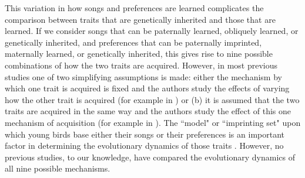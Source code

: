 \documentclass[12pt]{article}
\begin{document}
This variation in how songs and preferences are learned complicates the comparison between traits that are genetically inherited and those that are learned. If we consider songs that can be paternally learned, obliquely learned, or genetically inherited, and preferences that can be paternally imprinted, maternally learned, or genetically inherited, this gives rise to nine possible combinations of how the two traits are acquired. However, in most previous studies one of two simplifying assumptions is made:  either the mechanism by which one trait is acquired is fixed and the authors study the effects of varying how the other trait is acquired (for example in \cite{Gilman:2015fk,Verzijden:2005vn,Kirkpatrick:1994vn,Lachlan:2004tg}) or (b) it is assumed that the two traits are acquired in the same way and the authors study the effect of this one mechanism of acquisition (for example in \cite{Yeh:2015bh}). 
The ``model" or ``imprinting set" upon which young birds base either their songs or their preferences is an important factor in determining the evolutionary dynamics of those traits \cite{Tramm:2008ij}. However, no previous studies, to our knowledge, have compared the evolutionary dynamics of all nine possible mechanisms.
\end{document}
